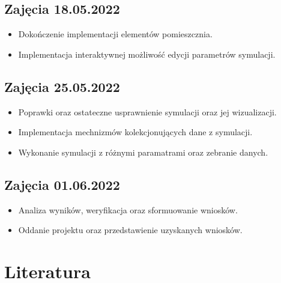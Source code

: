 \documentclass{article}
\begin{document}
\subsection{Zajęcia 18.05.2022}

\begin{itemize}
    \item
    Dokończenie implementacji elementów pomieszcznia.
    \item
    Implementacja interaktywnej możliwość edycji parametrów symulacji.
\end{itemize}

\subsection{Zajęcia 25.05.2022}

\begin{itemize}
    \item
    Poprawki oraz ostateczne usprawnienie symulacji oraz jej wizualizacji.
    \item
    Implementacja mechnizmów kolekcjonujących dane z symulacji.
    \item
    Wykonanie symulacji z różnymi paramatrami oraz zebranie danych.
\end{itemize}

\subsection{Zajęcia 01.06.2022}

\begin{itemize}
    \item
    Analiza wyników, weryfikacja oraz sformuowanie wniosków.
    \item
    Oddanie projektu oraz przedstawienie uzyskanych wniosków.
\end{itemize}

\section{Literatura}
\end{document}
